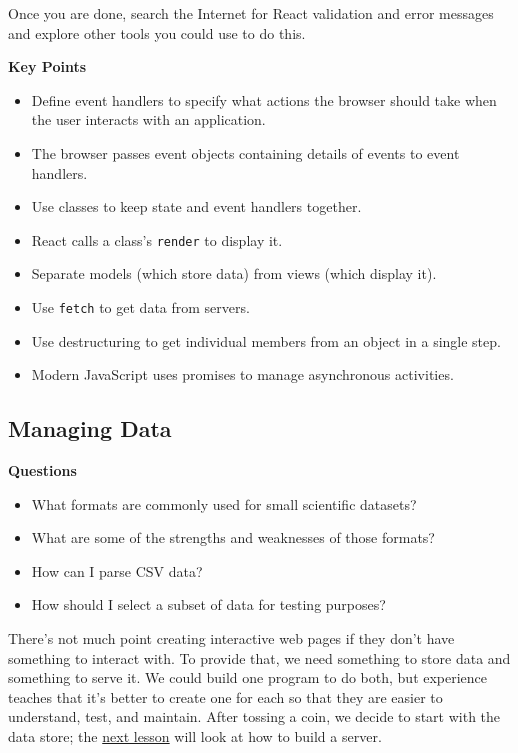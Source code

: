 Once you are done, search the Internet for React validation and error
messages and explore other tools you could use to do this.

\textbf{Key Points}

\begin{itemize}
\tightlist
\item
  Define event handlers to specify what actions the browser should take
  when the user interacts with an application.
\item
  The browser passes event objects containing details of events to event
  handlers.
\item
  Use classes to keep state and event handlers together.
\item
  React calls a class's \texttt{render} to display it.
\item
  Separate models (which store data) from views (which display it).
\item
  Use \texttt{fetch} to get data from servers.
\item
  Use destructuring to get individual members from an object in a single
  step.
\item
  Modern JavaScript uses promises to manage asynchronous activities.
\end{itemize}

\hypertarget{s:dataman}{\subsection{Managing Data}\label{s:dataman}}

\textbf{Questions}

\begin{itemize}
\tightlist
\item
  What formats are commonly used for small scientific datasets?
\item
  What are some of the strengths and weaknesses of those formats?
\item
  How can I parse CSV data?
\item
  How should I select a subset of data for testing purposes?
\end{itemize}

There's not much point creating interactive web pages if they don't have
something to interact with. To provide that, we need something to store
data and something to serve it. We could build one program to do both,
but experience teaches that it's better to create one for each so that
they are easier to understand, test, and maintain. After tossing a coin,
we decide to start with the data store; the
\protect\hyperlink{s:server}{next lesson} will look at how to build a
server.


